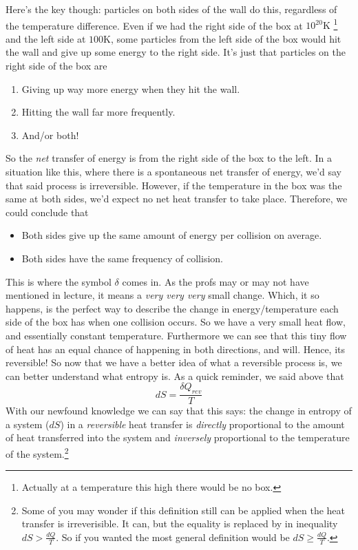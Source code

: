 \newline\newline
Here's the key though: particles on both sides of the wall do this, regardless of the temperature difference. Even if we had the right side of the box at $10^{20}\mathrm{K}$ \footnote{Actually at a temperature this high there would be no box.} and the left side at $100\mathrm{K}$, some particles from the left side of the box would hit the wall and give up some energy to the right side. It's just that particles on the right side of the box are
\begin{enumerate}
    \item Giving up way more energy when they hit the wall.
    \item Hitting the wall far more frequently.
    \item And/or both!
\end{enumerate}
So the \textit{net} transfer of energy is from the right side of the box to the left. In a situation like this, where there is a spontaneous net transfer of energy, we'd say that said process is irreversible. However, if the temperature in the box was the same at both sides, we'd expect no net heat transfer to take place. Therefore, we could conclude that
\begin{itemize}
    \item Both sides give up the same amount of energy per collision on average.
    \item Both sides have the same frequency of collision.
\end{itemize}
This is where the symbol $\delta$ comes in. As the profs may or may not have mentioned in lecture, it means a \textit{very very very} small change. Which, it so happens, is the perfect way to describe the change in energy/temperature each side of the box has when one collision occurs. So we have a very small heat flow, and essentially constant temperature. Furthermore we can see that this tiny flow of heat has an equal chance of happening in both directions, and will. Hence, its reversible!
\newline\newline
So now that we have a better idea of what a reversible process is, we can better understand what entropy is. As a quick reminder, we said above that
\begin{equation*}
    dS=\frac{\delta Q_{rev}}{T}
\end{equation*}
With our newfound knowledge we can say that this says: the change in entropy of a system ($dS$) in a \textit{reversible} heat transfer is \textit{directly} proportional to the amount of heat transferred into the system and \textit{inversely} proportional to the temperature of the system.\footnote{Some of you may wonder if this definition still can be applied when the heat transfer is irreverisible. It can, but the equality is replaced by in inequality $dS > \frac{dQ}{T}$. So if you wanted the most general definition would be $dS \geq \frac{dQ}{T}$.}

